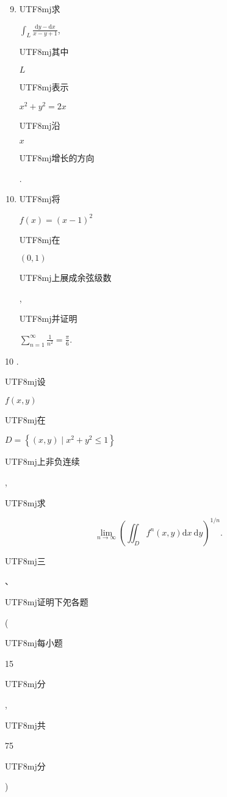 \documentclass[10pt]{article}
\begin{document}
\begin{enumerate}
  \setcounter{enumi}{8}
  \item \begin{CJK}{UTF8}{mj}求\end{CJK} $\int_{L} \frac{\mathrm{d} y-\mathrm{d} x}{x-y+1}$, \begin{CJK}{UTF8}{mj}其中\end{CJK} $L$ \begin{CJK}{UTF8}{mj}表示\end{CJK} $x^{2}+y^{2}=2 x$ \begin{CJK}{UTF8}{mj}沿\end{CJK} $x$ \begin{CJK}{UTF8}{mj}增长的方向\end{CJK}.

  \item \begin{CJK}{UTF8}{mj}将\end{CJK} $f(x)=(x-1)^{2}$ \begin{CJK}{UTF8}{mj}在\end{CJK} $(0,1)$ \begin{CJK}{UTF8}{mj}上展成余弦级数\end{CJK}, \begin{CJK}{UTF8}{mj}并证明\end{CJK} $\sum_{n=1}^{\infty} \frac{1}{n^{2}}=\frac{\pi}{6}$.

\end{enumerate}
10 . \begin{CJK}{UTF8}{mj}设\end{CJK} $f(x, y)$ \begin{CJK}{UTF8}{mj}在\end{CJK} $D=\left\{(x, y) \mid x^{2}+y^{2} \leqslant 1\right\}$ \begin{CJK}{UTF8}{mj}上非负连续\end{CJK}, \begin{CJK}{UTF8}{mj}求\end{CJK}
$$
\lim _{n \rightarrow \infty}\left(\iint_{D} f^{n}(x, y) \mathrm{d} x \mathrm{~d} y\right)^{1 / n} .
$$
\begin{CJK}{UTF8}{mj}三\end{CJK}、\begin{CJK}{UTF8}{mj}证明下夗各题\end{CJK} (\begin{CJK}{UTF8}{mj}每小题\end{CJK} 15 \begin{CJK}{UTF8}{mj}分\end{CJK}, \begin{CJK}{UTF8}{mj}共\end{CJK} 75 \begin{CJK}{UTF8}{mj}分\end{CJK})
\end{document}

